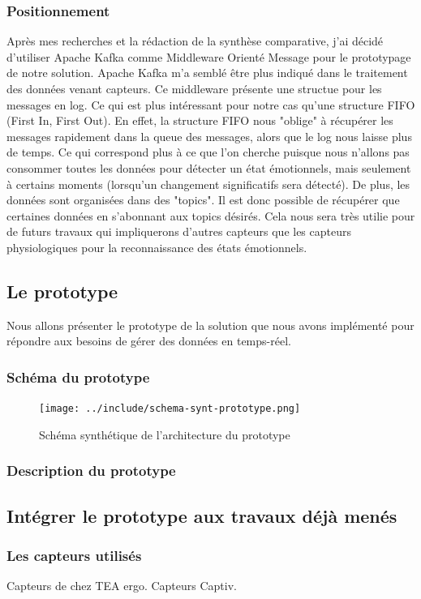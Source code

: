 \documentclass{article}
\begin{document}
		\subsubsection{Positionnement}
			Après mes recherches et la rédaction de la synthèse comparative, j'ai décidé d'utiliser Apache Kafka comme Middleware Orienté Message pour le prototypage de notre solution.
			Apache Kafka m'a semblé être plus indiqué dans le traitement des données venant capteurs.
			Ce middleware présente une structue pour les messages en log.
			Ce qui est plus intéressant pour notre cas qu'une structure FIFO (First In, First Out).
			En effet, la structure FIFO nous "oblige" à récupérer les messages rapidement dans la queue des messages, alors que le log nous laisse plus de temps.
			Ce qui correspond plus à ce que l'on cherche puisque nous n'allons pas consommer toutes les données pour détecter un état émotionnels, mais seulement à certains moments (lorsqu'un changement significatifs sera détecté).
			De plus, les données sont organisées dans des "topics".
			Il est donc possible de récupérer que certaines données en s'abonnant aux topics désirés.
			Cela nous sera très utilie pour de futurs travaux qui impliquerons d'autres capteurs que les capteurs physiologiques pour la reconnaissance des états émotionnels.
	\subsection{Le prototype}
		Nous allons présenter le prototype de la solution que nous avons implémenté pour répondre aux besoins de gérer des données en temps-réel.
		\subsubsection{Schéma du prototype}
			\begin{figure}
				\centering
				\texttt{[image: ../include/schema-synt-prototype.png]}
				\caption{Schéma synthétique de l'architecture du prototype}
				\label{fig:archiproto}
			\end{figure}
		\subsubsection{Description du prototype}
	\subsection{Intégrer le prototype aux travaux déjà menés}
		\subsubsection{Les capteurs utilisés}
			Capteurs de chez TEA ergo. Capteurs Captiv.
\end{document}
